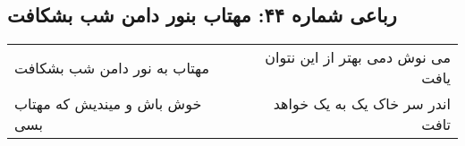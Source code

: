 \begin{center}
\section*{رباعی شماره ۴۴: مهتاب بنور دامن شب بشکافت}
\label{sec:sh044}
\begin{longtable}{l p{0.5cm} r}
مهتاب به نور دامن شب بشکافت
&&
می نوش دمی بهتر از این نتوان یافت
\\
خوش باش و میندیش که مهتاب بسی
&&
اندر سر خاک یک به یک خواهد تافت
\\
\end{longtable}
\end{center}
